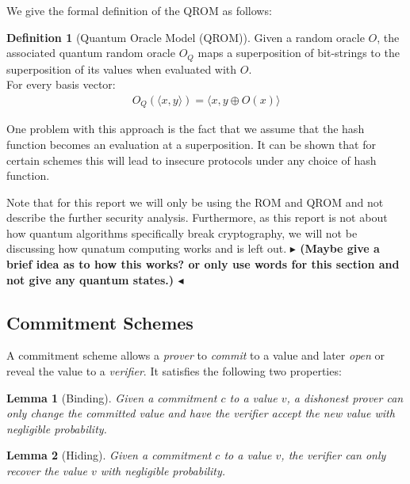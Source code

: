 \documentclass[11pt]{report}
\theoremstyle{definition}
\newtheorem{definition}{Definition}[section]
\theoremstyle{plain}
\newtheorem{lemma}{Lemma}[section]
\newcommand{\todo}[1]{{\color[rgb]{.5,0,0}\textbf{$\blacktriangleright$#1$\blacktriangleleft$}}}
\begin{document}
We give the formal definition of the QROM as follows:
\begin{definition}[Quantum Oracle Model (QROM)]
  Given a random oracle $O$, the associated quantum random oracle $O_Q$ maps a superposition of bit-strings to the superposition of its values when evaluated with $O$.\\
  For every basis vector:
  \begin{align}
    O_Q(\langle x,y \rangle) = \langle x,y \oplus O(x) \rangle
  \end{align}
\end{definition}
One problem with this approach is the fact that we assume that the hash function becomes an evaluation at a superposition. It can be shown that for certain schemes this will lead to insecure protocols under any choice of hash function.

Note that for this report we will only be using the ROM and QROM and not describe the further security analysis. Furthermore, as this report is not about how quantum algorithms specifically break cryptography, we will not be discussing how qunatum computing works and is left out.
\todo{ (Maybe give a brief idea as to how this works? or only use words for this section and not give any quantum states.) }

\subsection{Commitment Schemes}
A commitment scheme allows a \textit{prover} to \textit{commit} to a value and later \textit{open} or reveal the value to a \textit{verifier}. It satisfies the following two properties:

\begin{lemma}[Binding]\label{lem:binding}
  Given a commitment $c$ to a value $v$, a dishonest prover can only change the committed value and have the verifier accept the new value with negligible probability.
\end{lemma}
\begin{lemma}[Hiding]\label{lem:hiding}
  Given a commitment $c$ to a value $v$, the verifier can only recover the value $v$ with negligible probability.
\end{lemma}
\end{document}
